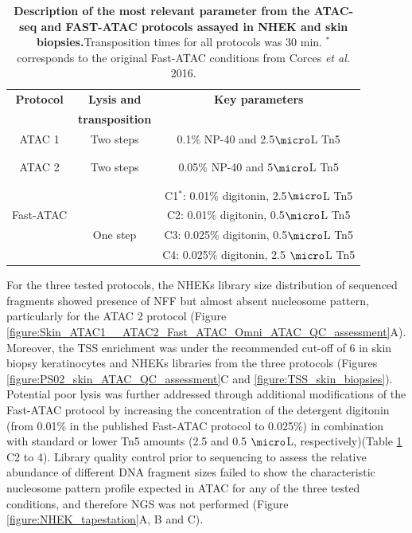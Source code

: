 \begin{table}[htbp]
\begin{tabular}{@{} c c c}
\toprule
\textbf{Protocol}   & \textbf{Lysis and} & \textbf{Key parameters} \\
                    & \textbf{transposition} &  \\
\midrule
\midrule
ATAC 1          & Two steps & 0.1\% NP-40 and 2.5$\micro$L Tn5  \\
\parencite{Buenrostro2013} && \\
&&\\
ATAC 2          &Two steps   & 0.05\% NP-40 and 5$\micro$L Tn5  \\
\parencite{Bao2015} &&\\
&&\\
                                 &             & C1$^\ast$: 0.01\% digitonin, 2.5$\micro$L Tn5 \\
 Fast-ATAC                       &             & C2: 0.01\% digitonin, 0.5$\micro$L Tn5 \\
\parencite{Corces2016}           & One step    & C3: 0.025\% digitonin, 0.5$\micro$L Tn5 \\
													       &             & C4: 0.025\% digitonin, 2.5 $\micro$L Tn5 \\
\bottomrule
\end{tabular}
\medskip %
\caption[Description of the most relevant parameter from the ATAC-seq and FAST-ATAC protocols assayed in NHEK and skin biopsies.]{\textbf{Description of the most relevant parameter from the ATAC-seq and FAST-ATAC protocols assayed in NHEK and skin biopsies.}Transposition times for all protocols was 30 min. $^\ast$ corresponds to the original Fast-ATAC conditions from Corces \textit{et al.} 2016.}
\label{tab:ATAC_skin_optimisation_protocols}
\end{table}
\bigskip %

For the three tested protocols, the NHEKs library size distribution of sequenced fragments showed presence of NFF but almost absent nucleosome pattern, particularly for the ATAC 2 protocol (Figure \ref{figure:Skin_ATAC1__ATAC2_Fast_ATAC_Omni_ATAC_QC_assessment}A). Moreover, the TSS enrichment was under the recommended cut-off of 6 in skin biopsy keratinocytes and NHEKs libraries from the three protocols (Figures \ref{figure:PS02_skin_ATAC_QC_assessment}C and \ref{figure:TSS_skin_biopsies}). Potential poor lysis was further addressed through additional modifications of the Fast-ATAC protocol by increasing the concentration of the detergent digitonin (from 0.01\% in the published Fast-ATAC protocol to 0.025\%) in combination with standard or lower Tn5 amounts (2.5 and 0.5 $\micro$L, respectively)(Table \ref{tab:ATAC_skin_optimisation_protocols} C2 to 4). Library quality control prior to sequencing to assess the relative abundance of different DNA fragment sizes failed to show the characteristic nucleosome pattern profile expected in ATAC for any of the three tested conditions, and therefore NGS was not performed (Figure \ref{figure:NHEK_tapestation}A, B and C).

